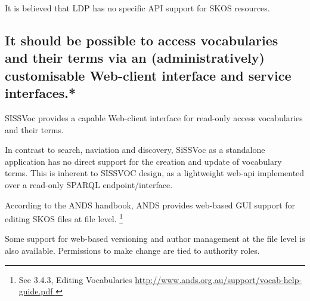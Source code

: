 \documentclass[10pt,a4paper]{article}
\begin{document}
\begin{flushleft}
It is believed that LDP has no specific API support for SKOS resources.

% 
% 
% 

  \subsection{
  It should be possible to access vocabularies and their terms via an 
  (administratively) customisable Web-client interface and service interfaces.* } 


  SISSVoc provides a capable Web-client interface for read-only access vocabularies and their terms.

  In contrast to search, naviation and discovery, SiSSVoc as a standalone application has no direct 
  support for the creation and update of vocabulary terms. This is inherent to SISSVOC design, as a 
  lightweight web-api implemented over a read-only SPARQL endpoint/interface.  

%    
  According to the ANDS handbook, ANDS provides web-based GUI support for editing SKOS files at file level. 
  \footnote { See 3.4.3, Editing Vocabularies \url{ http://www.ands.org.au/support/vocab-help-guide.pdf } 
  }

  Some support for web-based versioning and author management at the file level
is also available. Permissions to make change are tied to authority roles.


\end{flushleft}
\end{document}
